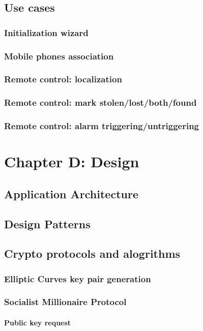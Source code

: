 \documentclass[a4paper,12pt]{article}
\begin{document}
	\section{Use cases}
		\subsection{Initialization wizard}
		\subsection{Mobile phones association}
		\subsection{Remote control: localization}
		\subsection{Remote control: mark stolen/lost/both/found}
		\subsection{Remote control: alarm triggering/untriggering}
\clearpage

\noindent	
\Huge{\chapter{Chapter D: Design}}
	\section{Application Architecture}
	\section{Design Patterns}
	\section{Crypto protocols and alogrithms}
		\subsection{Elliptic Curves key pair generation}
		\subsection{Socialist Millionaire Protocol}
			\subsubsection{Public key request}
\end{document}
